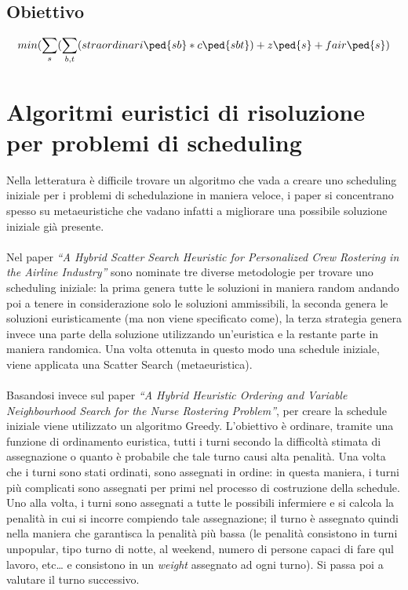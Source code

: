 \subsection{Obiettivo}
\[ min (\sum_{s}(\sum_{b,t}(straordinari\ped{sb}*c\ped{sbt}) + z\ped{s}+fair\ped{s}) \]

\section{Algoritmi euristici di risoluzione per problemi di scheduling}
Nella letteratura è difficile trovare un algoritmo che vada a creare uno scheduling iniziale per i problemi di schedulazione in maniera veloce, i paper si concentrano spesso su metaeuristiche che vadano infatti a migliorare una possibile soluzione iniziale già presente. \\
\\
Nel paper \textit{“A Hybrid Scatter Search Heuristic for Personalized Crew Rostering in the Airline Industry”} sono nominate tre diverse metodologie per trovare uno scheduling iniziale: la prima genera tutte le soluzioni in maniera random andando poi a tenere in considerazione solo le soluzioni ammissibili, la seconda genera le soluzioni euristicamente (ma non viene specificato come), la terza strategia genera invece una parte della soluzione utilizzando un’euristica e la restante parte in maniera randomica. Una volta ottenuta in questo modo una schedule iniziale, viene applicata una Scatter Search (metaeuristica).\\
\\
Basandosi invece sul paper \textit{“A Hybrid Heuristic Ordering and Variable Neighbourhood Search for the Nurse Rostering Problem”}, per creare la schedule iniziale viene utilizzato un algoritmo Greedy.
L’obiettivo è ordinare, tramite una funzione di ordinamento euristica, tutti i turni secondo la difficoltà stimata di assegnazione o quanto è probabile che tale turno causi alta penalità. 
Una volta che i turni sono stati ordinati, sono assegnati in ordine: in questa maniera, i turni più complicati sono assegnati per primi nel processo di costruzione della schedule. Uno alla volta, i turni sono assegnati a tutte le possibili infermiere e si calcola la penalità in cui si incorre compiendo tale assegnazione; il turno è assegnato quindi nella maniera che garantisca la penalità più bassa (le penalità consistono in turni unpopular, tipo turno di notte, al weekend, numero di persone capaci di fare qul lavoro, etc… e consistono in un \textit{weight} assegnato ad ogni turno). Si passa poi a valutare il turno successivo.\\
